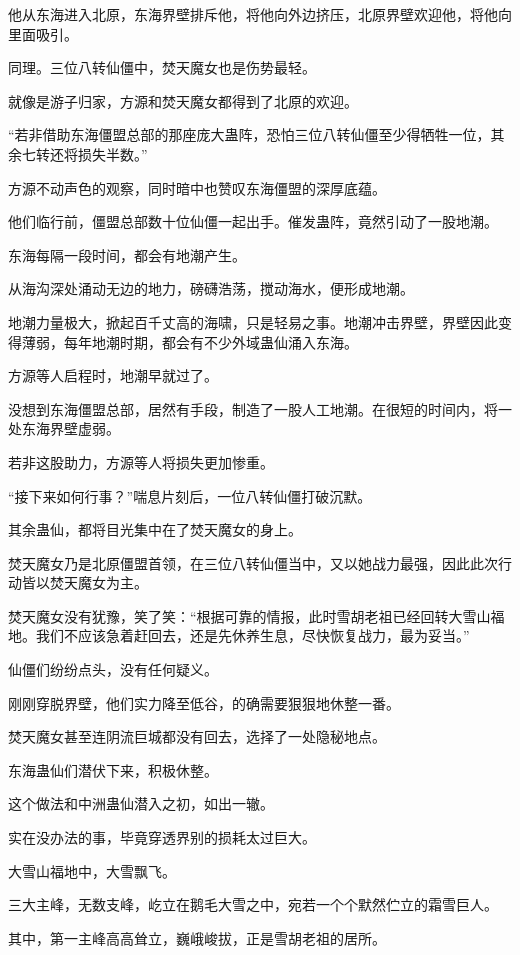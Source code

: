 \begin{this_body}
他从东海进入北原，东海界壁排斥他，将他向外边挤压，北原界壁欢迎他，将他向里面吸引。

同理。三位八转仙僵中，焚天魔女也是伤势最轻。

就像是游子归家，方源和焚天魔女都得到了北原的欢迎。

“若非借助东海僵盟总部的那座庞大蛊阵，恐怕三位八转仙僵至少得牺牲一位，其余七转还将损失半数。”

方源不动声色的观察，同时暗中也赞叹东海僵盟的深厚底蕴。

他们临行前，僵盟总部数十位仙僵一起出手。催发蛊阵，竟然引动了一股地潮。

东海每隔一段时间，都会有地潮产生。

从海沟深处涌动无边的地力，磅礴浩荡，搅动海水，便形成地潮。

地潮力量极大，掀起百千丈高的海啸，只是轻易之事。地潮冲击界壁，界壁因此变得薄弱，每年地潮时期，都会有不少外域蛊仙涌入东海。

方源等人启程时，地潮早就过了。

没想到东海僵盟总部，居然有手段，制造了一股人工地潮。在很短的时间内，将一处东海界壁虚弱。

若非这股助力，方源等人将损失更加惨重。

“接下来如何行事？”喘息片刻后，一位八转仙僵打破沉默。

其余蛊仙，都将目光集中在了焚天魔女的身上。

焚天魔女乃是北原僵盟首领，在三位八转仙僵当中，又以她战力最强，因此此次行动皆以焚天魔女为主。

焚天魔女没有犹豫，笑了笑：“根据可靠的情报，此时雪胡老祖已经回转大雪山福地。我们不应该急着赶回去，还是先休养生息，尽快恢复战力，最为妥当。”

仙僵们纷纷点头，没有任何疑义。

刚刚穿脱界壁，他们实力降至低谷，的确需要狠狠地休整一番。

焚天魔女甚至连阴流巨城都没有回去，选择了一处隐秘地点。

东海蛊仙们潜伏下来，积极休整。

这个做法和中洲蛊仙潜入之初，如出一辙。

实在没办法的事，毕竟穿透界别的损耗太过巨大。

大雪山福地中，大雪飘飞。

三大主峰，无数支峰，屹立在鹅毛大雪之中，宛若一个个默然伫立的霜雪巨人。

其中，第一主峰高高耸立，巍峨峻拔，正是雪胡老祖的居所。


\end{this_body}
